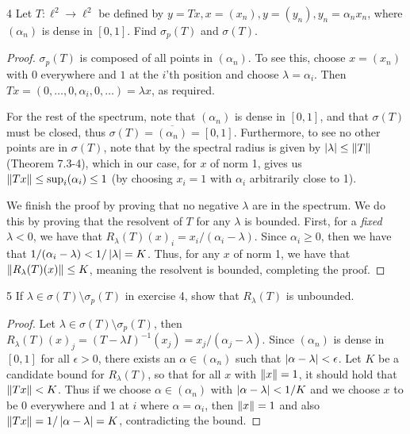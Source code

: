 \begin{exercise}{4}
Let $T: \ell^2 \to \ell^2$ be defined by $y = Tx, x = (x_n), y = (y_n), y_n = \alpha_n x_n$, where $(\alpha_n)$ is dense in $[0, 1]$.
Find $\sigma_p(T)$ and $\sigma(T)$.
\end{exercise}
\begin{proof}
$\sigma_p(T)$ is composed of all points in $(\alpha_n)$.
To see this, choose $x = (x_n)$ with 0 everywhere and $1$ at the $i$'th position and choose $\lambda = \alpha_i$.
Then $T x = (0, \dots, 0, \alpha_i, 0, \dots) = \lambda x$, as required.

For the rest of the spectrum, note that $(\alpha_n)$ is dense in $[0, 1]$, and that $\sigma(T)$ must be closed, thus $\sigma(T) = \overline{(\alpha_n)} = [0, 1]$.
Furthermore, to see no other points are in $\sigma(T)$, note that by the spectral radius is given by $\left\lvert \lambda\right\rvert \leq \left\lVert T\right\rVert$ (Theorem 7.3-4), which in our case, for $x$ of norm 1, gives us $\left\lVert Tx\right\rVert \leq \sup_i(\alpha_i) \leq 1$ (by choosing $x_i = 1$ with $\alpha_i$ arbitrarily close to 1).

We finish the proof by proving that no negative $\lambda$ are in the spectrum.
We do this by proving that the resolvent of $T$ for any $\lambda$ is bounded.
First, for a \emph{fixed} $\lambda < 0$, we have that $R_\lambda(T)(x)_i = x_i/(\alpha_i - \lambda)$.
Since $\alpha_i \geq 0$, then we have that $1/(\alpha_i - \lambda) < 1/\left\lvert \lambda\right\rvert = K$.
Thus, for any $x$ of norm 1, we have that $\left\lVert R_\lambda(T)(x)\right\rVert \leq K$, meaning the resolvent is bounded, completing the proof.
\end{proof} 

\begin{exercise}{5}
If $\lambda \in \sigma(T) \setminus \sigma_p(T)$ in exercise 4, show that $R_\lambda(T)$ is unbounded.
\end{exercise}
\begin{proof}
Let $\lambda \in \sigma(T) \setminus \sigma_p(T)$, then $R_\lambda(T)(x)_j = (T - \lambda I)^{-1}(x_j) = x_j/(\alpha_j - \lambda)$.
Since $(\alpha_n)$ is dense in $[0, 1]$ for all $\epsilon > 0$, there exists an $\alpha \in (\alpha_n)$ such that $\left\lvert \alpha - \lambda\right\rvert < \epsilon$.
Let $K$ be a candidate bound for $R_\lambda(T)$, so that for all $x$ with $\left\lVert x\right\rVert = 1$, it should hold that $\left\lVert Tx\right\rVert < K$.
Thus if we choose $\alpha \in (\alpha_n)$ with $\left\lvert \alpha - \lambda\right\rvert< 1/K$ and we choose $x$ to be 0 everywhere and 1 at $i$ where $\alpha = \alpha_i$, then $\left\lVert x\right\rVert = 1$ and also $\left\lVert Tx\right\rVert = 1/\left\lvert \alpha - \lambda\right\rvert = K$, contradicting the bound.
\end{proof} 

